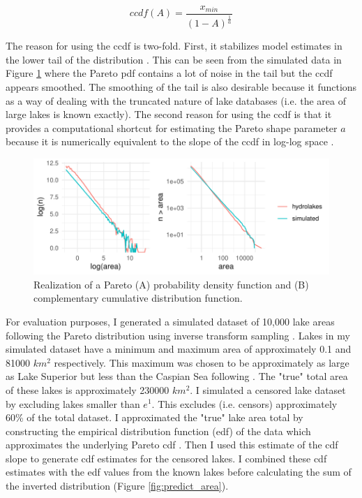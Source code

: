 \documentclass{article}
\begin{document}
\begin{equation}
	ccdf(A) = \frac{x_{min}}{(1-A)^{\frac{1}{\alpha}}}
	\label{eqn:pareto_ccdf}
\end{equation}

The reason for using the ccdf is two-fold. First, it stabilizes model estimates in the lower tail of the distribution \citep{newman_power_2005}. This can be seen from the simulated data in Figure \ref{fig:pareto_demo} where the Pareto pdf contains a lot of noise in the tail but the ccdf appears smoothed. The smoothing of the tail is also desirable because it functions as a way of dealing with the truncated nature of lake databases (i.e. the area of large lakes is known exactly). The second reason for using the ccdf is that it provides a computational shortcut for estimating the Pareto shape parameter $a$ because it is numerically equivalent to the slope of the ccdf in log-log space \citep{downingGlobalAbundanceSize2006}.

\begin{figure}
	\centering
	\includegraphics{figures/pareto_demo-1}
	\caption{Realization of a Pareto (A) probability density function and (B) complementary cumulative distribution function.}
	\label{fig:pareto_demo}
\end{figure}

For evaluation purposes, I generated a simulated dataset of 10,000 lake areas following the Pareto distribution using inverse transform sampling \citep{newman_power_2005}. Lakes in my simulated dataset have a minimum and maximum area of approximately 0.1 and 81000 $km^2$ respectively. This maximum was chosen to be approximately as large as Lake Superior but less than the Caspian Sea following \citet{lehnerDevelopmentValidationGlobal2004}. The "true" total area of these lakes is approximately 230000 $km^2$. I simulated a censored lake dataset by excluding lakes smaller than $e^{1}$. This excludes (i.e. censors) approximately 60\% of the total dataset. I approximated the "true" lake area total by constructing the empirical distribution function (edf) of the data which approximates the underlying Pareto cdf \citep{newman_power_2005}. Then I used this estimate of the cdf slope to generate cdf estimates for the censored lakes. I combined these cdf estimates with the edf values from the known lakes before calculating the sum of the inverted distribution (Figure \ref{fig:predict_area}).
\end{document}
